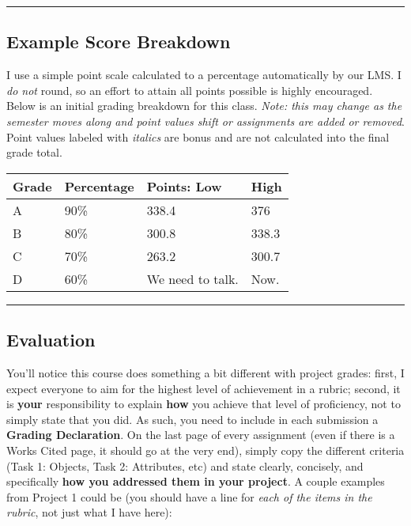 \documentclass[]{article}
\begin{document}
\begin{center}\rule{0.5\linewidth}{\linethickness}\end{center}

\hypertarget{example-score-breakdown}{%
\subsection{Example Score Breakdown}\label{example-score-breakdown}}

I use a simple point scale calculated to a percentage automatically by
our LMS. I \emph{do not} round, so an effort to attain all points
possible is highly encouraged. Below is an initial grading breakdown for
this class. \emph{Note: this may change as the semester moves along and
point values shift or assignments are added or removed}. Point values
labeled with \emph{italics} are bonus and are not calculated into the
final grade total.

\begin{longtable}[]{@{}llll@{}}
\toprule
Grade & Percentage & Points: Low & High\tabularnewline
\midrule
\endhead
A & 90\% & 338.4 & 376\tabularnewline
B & 80\% & 300.8 & 338.3\tabularnewline
C & 70\% & 263.2 & 300.7\tabularnewline
D & 60\% & We need to talk. & Now.\tabularnewline
\bottomrule
\end{longtable}

\begin{center}\rule{0.5\linewidth}{\linethickness}\end{center}

\hypertarget{evaluation}{%
\subsection{Evaluation}\label{evaluation}}

You'll notice this course does something a bit different with project
grades: first, I expect everyone to aim for the highest level of
achievement in a rubric; second, it is \textbf{your} responsibility to
explain \textbf{how} you achieve that level of proficiency, not to
simply state that you did. As such, you need to include in each
submission a \textbf{Grading Declaration}. On the last page of every
assignment (even if there is a Works Cited page, it should go at the
very end), simply copy the different criteria (Task 1: Objects, Task 2:
Attributes, etc) and state clearly, concisely, and specifically
\textbf{how you addressed them in your project}. A couple examples from
Project 1 could be (you should have a line for \emph{each of the items
in the rubric}, not just what I have here):
\end{document}
